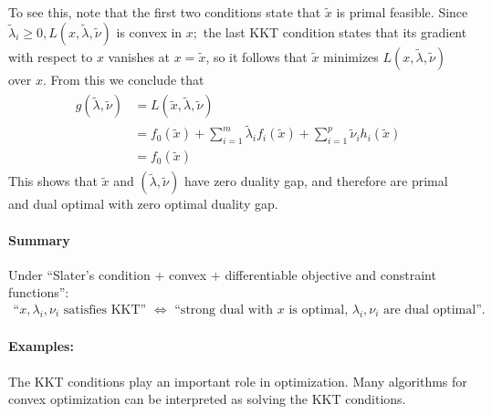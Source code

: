 \documentclass{article}
\begin{document}
To see this, note that the first two conditions state that $\tilde{x}$ is primal feasible. Since $\tilde{\lambda}_{i} \geq 0, L(x, \tilde{\lambda}, \tilde{\nu})$ is convex in $x ;$ the last KKT condition states that its gradient with respect to $x$ vanishes at $x=\tilde{x}$, so it follows that $\tilde{x}$ minimizes $L(x, \tilde{\lambda}, \tilde{\nu})$ over $x$. From this we conclude that
\begin{align*}
\begin{aligned}
g(\tilde{\lambda}, \tilde{\nu}) &=L(\tilde{x}, \tilde{\lambda}, \tilde{\nu}) \\
&=f_{0}(\tilde{x})+\sum_{i=1}^{m} \tilde{\lambda}_{i} f_{i}(\tilde{x})+\sum_{i=1}^{p} \tilde{\nu}_{i} h_{i}(\tilde{x}) \\
&=f_{0}(\tilde{x})
\end{aligned}
\end{align*}
This shows that $\tilde{x}$ and $(\tilde{\lambda}, \tilde{\nu})$ have zero duality gap, and therefore are primal and dual optimal with zero optimal duality gap. 

\paragraph{Summary}
Under ``Slater's condition + convex + differentiable objective and constraint functions'': 
\begin{align}
        \text{``$x,\lambda_i,\nu_i$  satisfies KKT'' $\Longleftrightarrow$ ``strong dual with $x$ is optimal, $\lambda_i,\nu_i$ are dual optimal''.}
    \end{align}
\paragraph{Examples:}
The KKT conditions play an important role in optimization. Many algorithms for convex optimization can be interpreted as solving the KKT conditions.
\end{document}
